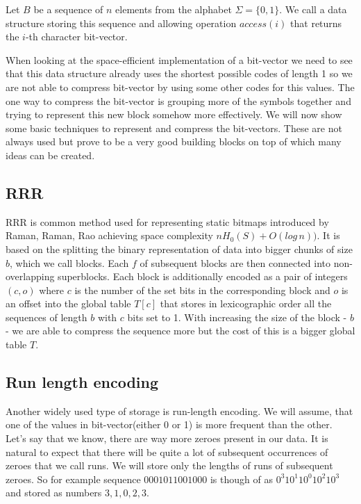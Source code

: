 \begin{theorem}
Let $B$ be a sequence of $n$ elements from the alphabet $\Sigma = \{0, 1\}$. We call a data structure storing this sequence
and allowing operation $access(i)$ that returns the $i$-th character bit-vector.
\end{theorem}

When looking at the space-efficient implementation of a bit-vector we need to see that this data structure already uses the shortest possible codes of length 1 so we are not able to compress bit-vector by using some other codes for this values. The one way to compress the bit-vector is grouping more of the symbols together and trying to represent this new block somehow more effectively. We will now show some basic techniques to represent and compress the bit-vectors. These are not always used but prove to be a very good building blocks on top of which many ideas can be created.

\subsection{RRR}

RRR is common method used for representing static bitmaps introduced by Raman, Raman, Rao \cite{raman2007succinct} achieving space complexity $nH_0(S) + O(log\,n))$. It is based on the splitting the binary representation of data into bigger chunks of size $b$, which we call blocks.
Each $f$ of subsequent blocks are then connected into non-overlapping superblocks. Each block is additionally encoded as a pair of integers $(c, o)$ where $c$
is the number of the set bits in the corresponding block and $o$ is an offset into the global table $T[c]$ that stores in lexicographic order all the sequences of
length $b$ with $c$ bits set to 1. With increasing the size of the block - $b$ - we are able to compress the sequence more but the cost of this is a bigger global table $T$.

\subsection{Run length encoding}

Another widely used type of storage is run-length encoding. We will assume, that one of the values in bit-vector(either 0 or 1) is more frequent than the other. Let's say that we know, there are way more zeroes present in our data. It is natural to expect that there will be quite a lot of subsequent occurrences of zeroes that we call runs. We will store only the lengths of runs of subsequent zeroes. So for example
sequence $0001011001000$ is though of as $0^{3}10^{1}10^{0}10^{2}10^{3}$ and stored as numbers $3, 1, 0, 2, 3$.

